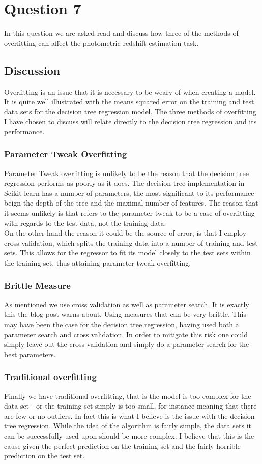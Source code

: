 \section{Question 7}
In this question we are asked read \cite{langford} and discuss how three of the methods of overfitting can affect the photometric redshift estimation task.
\subsection{Discussion}
Overfitting is an issue that it is necessary to be weary of when creating a model. It is quite well illustrated with the means squared error on the training and test data sets for the decision tree regression model. The three methods of overfitting I have chosen to discuss will relate directly to the decision tree regression and its performance.
\subsubsection{Parameter Tweak Overfitting}
Parameter Tweak overfitting is unlikely to be the reason that the decision tree regression performs as poorly as it does. The decision tree implementation in Scikit-learn \citep{scikit-learn} has a number of parameters, the most significant to its performance beign the depth of the tree and the maximal number of features. The reason that it seems unlikely is that \cite{langford} refers to the parameter tweak to be a case of overfitting with regards to the test data, not the training data.\\
On the other hand the reason it could be the source of error, is that I employ cross validation, which splits the training data into a number of training and test sets. This allows for the regressor to fit its model closely to the test sets within the training set, thus attaining parameter tweak overfitting.
\subsubsection{Brittle Measure}
As mentioned we use cross validation as well as parameter search. It is exactly this the blog post warns about. Using measures that can be very brittle. This may have been the case for the decision tree regression, having used both a parameter search and cross validation. In order to mitigate this risk one could simply leave out the cross validation and simply do a parameter search for the best parameters.

\subsubsection{Traditional overfitting}
Finally we have traditional overfitting, that is the model is too complex for the data set - or the training set simply is too small, for instance meaning that there are few or no outliers. In fact this is what I believe is the issue with the decision tree regression. While the idea of the algorithm is fairly simple, the data sets it can be successfully used upon should be more complex. I believe that this is the cause given the perfect prediction on the training set and the fairly horrible prediction on the test set.
